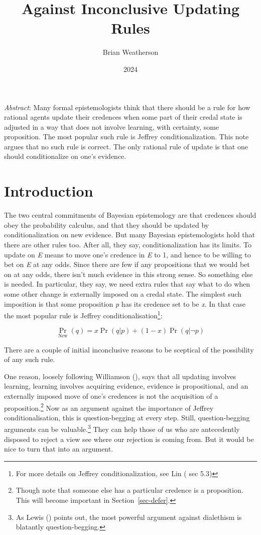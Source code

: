 \documentclass[
  11pt,
  letterpaper,
  DIV=11,
  numbers=noendperiod,
  twoside]{scrartcl}
\title{Against Inconclusive Updating Rules}
\author{Brian Weatherson}
\date{2024}
\renewenvironment{abstract}
 {\vspace{-1.25cm}
 \quotation\small\noindent\emph{Abstract}:}
 {\endquotation}
\begin{document}
\maketitle
\begin{abstract}
Many formal epistemologists think that there should be a rule for how
rational agents update their credences when some part of their credal
state is adjusted in a way that does not involve learning, with
certainty, some proposition. The most popular such rule is Jeffrey
conditionalization. This note argues that no such rule is correct. The
only rational rule of update is that one should conditionalize on one's
evidence.
\end{abstract}


\section{Introduction}\label{sec-intro}

The two central commitments of Bayesian epistemology are that credences
should obey the probability calculus, and that they should be updated by
conditionalization on new evidence. But many Bayesian epistemologists
hold that there are other rules too. After all, they say,
conditionalization has its limits. To update on \emph{E} means to move
one's credence in \emph{E} to 1, and hence to be willing to bet on
\emph{E} at any odds. Since there are few if any propositions that we
would bet on at any odds, there isn't much evidence in this strong
sense. So something else is needed. In particular, they say, we need
extra rules that say what to do when some other change is externally
imposed on a credal state. The simplest such imposition is that some
proposition \emph{p} has its credence set to be \emph{x}. In that case
the most popular rule is Jeffrey conditionalisation\footnote{For more
  details on Jeffrey conditionalization, see Lin
  ( sec 5.3)}:

\[
\Pr_{\text{New}}(q) = x\Pr(q | p) + (1-x)\Pr(q | \neg p)
\]

There are a couple of initial inconclusive reasons to be sceptical of
the possibility of any such rule.

One reason, loosely following Williamson
(), says that all updating involves
learning, learning involves acquiring evidence, evidence is
propositional, and an externally imposed move of one's credences is not
the acquisition of a proposition.\footnote{Though note that someone else
  has a particular credence is a proposition. This will become important
  in Section~\ref{sec-defer}.} Now as an argument against the importance
of Jeffrey conditionalisation, this is question-begging at every step.
Still, question-begging arguments can be valuable.\footnote{As Lewis
  () points out, the most powerful
  argument against dialethism is blatantly question-begging.} They can
help those of us who are antecedently disposed to reject a view see
where our rejection is coming from. But it would be nice to turn that
into an argument.
\end{document}
